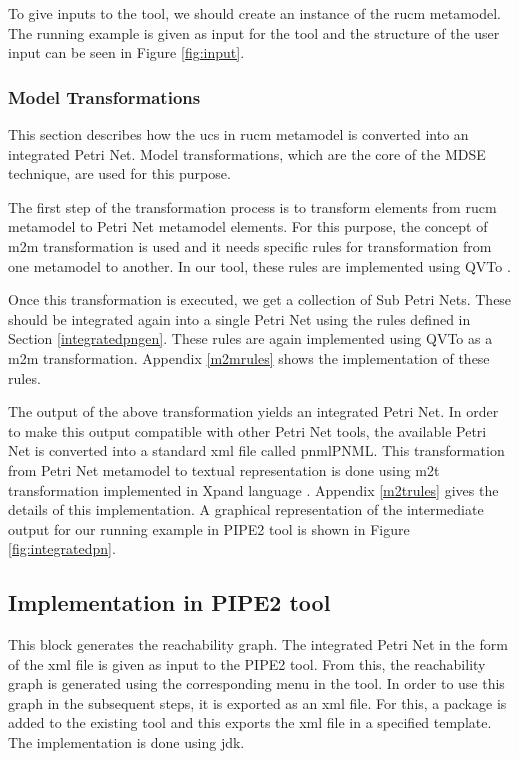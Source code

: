 To give inputs to the tool, we should create an instance of the \gls{rucm} metamodel. The running example is given as input for the tool and the structure of the user input can be seen in Figure \ref{fig:input}.

\subsubsection{Model Transformations}
This section describes how the \gls{ucs} in \gls{rucm} metamodel is converted into an integrated Petri Net. Model transformations, which are the core of the MDSE technique, are used for this purpose.

The first step of the transformation process is to transform elements from \gls{rucm} metamodel to Petri Net metamodel elements. For this purpose, the concept of \gls{m2m} transformation is used and it needs specific rules for transformation from one metamodel to another.  In our tool, these rules are implemented using QVTo \cite{eclipseqvt}. 

Once this transformation is executed, we get a collection of Sub Petri Nets. These should be integrated again into a single Petri Net using the rules defined in Section \ref{integratedpngen}. These rules are again implemented using QVTo as a \gls{m2m} transformation. Appendix \ref{m2mrules} shows the implementation of these rules.

The output of the above transformation yields an integrated Petri Net. In order to make this output compatible with other Petri Net tools, the available Petri Net is converted into a standard xml file called \gls{pnml}PNML. This transformation from Petri Net metamodel to textual representation is done using \gls{m2t} transformation implemented in Xpand language \cite{eclipsem2t}. Appendix \ref{m2trules} gives the details of this implementation. A graphical representation of the intermediate output for our running example in PIPE2 tool is shown in Figure \ref{fig:integratedpn}.

\subsection{Implementation in PIPE2 tool}
This block generates the reachability graph. The integrated Petri Net in the form of the xml file is given as input to the PIPE2 tool. From this, the reachability graph is generated using the corresponding menu in the tool. In order to use this graph in the subsequent steps, it is exported as an xml file. For this, a package is added to the existing tool and this exports the xml file in a specified template. The implementation is done using \gls{jdk}.

